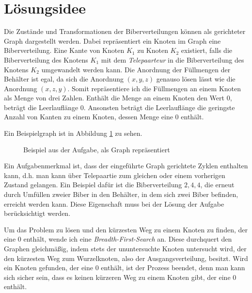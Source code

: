 \documentclass[a4paper,10pt,ngerman]{scrartcl}
\title{\Aufgabe}
\author{\Name\\Einsendenummer: \Einsendenummer}
\date{\today}
\begin{document}
\maketitle
\tableofcontents

\section{Lösungsidee}
Die Zustände und Transformationen der Biberverteilungen können als gerichteter Graph dargestellt werden.
Dabei repräsentiert ein Knoten im Graph eine Biberverteilung.
Eine Kante von Knoten $K_1$ zu Knoten $K_2$ existiert, falls die Biberverteilung des Knotens $K_1$ mit dem \textit{Telepaarteur} in die Biberverteilung des Knotens $K_2$ umgewandelt werden kann.
Die Anordnung der Füllmengen der Behälter ist egal, da sich die Anordnung $(x,y,z)$ genauso lösen lässt wie die Anordnung $(x,z,y)$.
Somit repräsentiere ich die Füllmengen an einem Knoten als Menge von drei Zahlen.
Enthält die Menge an einem Knoten den Wert 0, beträgt die Leerlauflänge 0.
Ansonsten beträgt die Leerlauflänge die geringste Anzahl von Kanten zu einem Knoten, dessen Menge eine 0 enthält.

Ein Beispielgraph ist in Abbildung \ref{fig:graph-idee} zu sehen.

\begin{figure}
\centering
{}
\label{fig:graph-idee}
\caption{Beispiel aus der Aufgabe, als Graph repräsentiert}
\end{figure}

Ein Aufgabenmerkmal ist, dass der eingeführte Graph gerichtete Zyklen enthalten kann, d.h. man kann über Telepaartie zum gleichen oder einem vorherigen Zustand gelangen.
Ein Beispiel dafür ist die Biberverteilung ${2,4,4}$, die erneut durch Umfüllen zweier Biber in den Behälter, in dem sich zwei Biber befinden, erreicht werden kann.
Diese Eigenschaft muss bei der Lösung der Aufgabe berücksichtigt werden.

Um das Problem zu lösen und den kürzesten Weg zu einem Knoten zu finden, der eine $0$ enthält, wende ich eine \textit{Breadth-First-Search} an.
Diese durchquert den Graphen gleichmäßig, indem stets der ununtersuchte Knoten untersucht wird, der den kürzesten Weg zum Wurzelknoten, also der Ausgangsverteilung, besitzt.
Wird ein Knoten gefunden, der eine $0$ enthält, ist der Prozess beendet, denn man kann sich sicher sein, dass es keinen kürzeren Weg zu einem Knoten gibt, der eine $0$ enthält.
\end{document}
